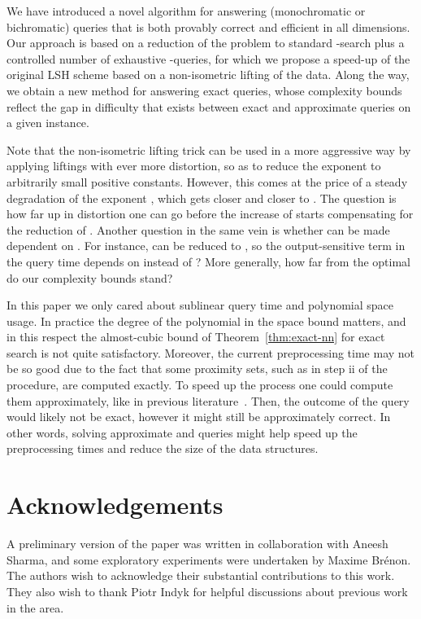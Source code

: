 We have introduced a novel algorithm for answering (monochromatic or
bichromatic) \rnn queries that is both provably correct and 
efficient in all dimensions. Our approach is based on a reduction of
the problem to standard -\nn search plus a controlled number of
exhaustive -\pleb queries, for which we propose a speed-up of the
original LSH scheme based on a non-isometric lifting of the
data. Along the way, we obtain a new method for answering exact \nn
queries, whose complexity bounds reflect the gap in difficulty that
exists between exact and approximate queries on a given instance.

Note that the non-isometric lifting trick can be used in a more
aggressive way by applying liftings with ever more distortion, so as
to reduce the exponent  to arbitrarily small positive
constants. However, this comes at the price of a steady degradation of
the exponent , which gets closer and closer to . The
question is how far up in distortion one can go before the increase of
 starts compensating for the reduction of .  Another
question in the same vein is whether  can be made dependent on
. For instance, can  be reduced to , so the output-sensitive term in the query time depends on  instead of ?  More generally, how far from the
optimal do our complexity bounds stand?

In this paper we only cared about sublinear query time and polynomial
space usage. In practice the degree of the polynomial in the space
bound matters, and in this respect the almost-cubic bound of
Theorem~\ref{thm:exact-nn} for exact \nn search is not quite
satisfactory. Moreover, the current preprocessing time may not be so good
due to the fact that some proximity sets, such as 
in step ii of the \rnn procedure, are computed
exactly. To speed up the process one could compute them approximately,
like in previous
literature~\cite{HarPeledIndykMotwani}. Then, the outcome of the
query would likely not be exact, however it might still be
approximately correct. In other words, solving approximate \nn and
\rnn queries might help speed up the preprocessing times and
reduce the size of the data structures.

\section*{Acknowledgements}
A preliminary version of the paper was written in collaboration with
Aneesh Sharma, and some exploratory experiments were undertaken by
Maxime Br\'enon. The authors wish to acknowledge their substantial
contributions to this work. They also wish to thank Piotr Indyk for
helpful discussions about previous work in the area.

